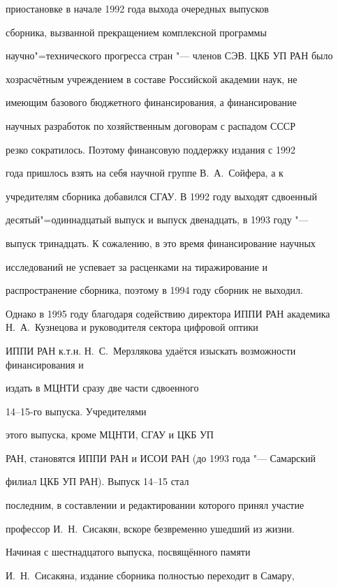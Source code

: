 приостановке в начале 1992 года выхода очередных выпусков

сборника, вызванной прекращением комплексной программы

научно"=технического прогресса стран "--- членов СЭВ. ЦКБ УП РАН было

хозрасчётным учреждением в составе Российской академии наук, не

имеющим базового бюджетного финансирования, а финансирование

научных разработок по хозяйственным договорам с распадом СССР

резко сократилось. Поэтому финансовую поддержку издания с 1992

года пришлось взять на себя научной группе В.~А.~Сойфера, а к

учредителям сборника добавился СГАУ. В 1992 году выходят сдвоенный

десятый"=одиннадцатый выпуск и выпуск двенадцать, в 1993 году "---

выпуск тринадцать. К сожалению, в это время финансирование научных

исследований не успевает за расценками на тиражирование и

распространение сборника, поэтому в 1994 году сборник не выходил.







Однако в 1995 году благодаря содействию директора ИППИ РАН академика Н.~А.~Кузнецова и руководителя сектора цифровой оптики

ИППИ РАН к.т.н. Н.~С.~Мерзлякова удаётся изыскать возможности финансирования и

издать в МЦНТИ сразу две части сдвоенного

14--15-го выпуска. Учредителями

этого выпуска, кроме МЦНТИ, СГАУ и ЦКБ УП

РАН, становятся ИППИ РАН и ИСОИ РАН (до 1993 года "--- Самарский

филиал ЦКБ УП РАН). Выпуск 14--15 стал

последним, в составлении и редактировании которого принял участие

профессор И.~Н.~Сисакян, вскоре безвременно ушедший из жизни.



Начиная с шестнадцатого выпуска, посвящённого памяти

И.~Н.~Сисакяна, издание сборника полностью переходит в Самару,

